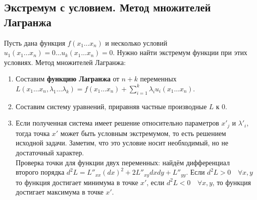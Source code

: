 \subsection{Экстремум с условием. Метод множителей Лагранжа}
Пусть дана функция $f(x_1 \ldots x_n)$ и несколько условий $u_1(x_1 \ldots x_n) = 0 \ldots u_k(x_1 \ldots x_n) = 0$. Нужно найти экстремум функции при этих условиях. Метод множителей Лагранжа:
\begin{enumerate}
	\item Составим \textbf{функцию Лагранжа} от $n + k$ переменных $L(x_1 \ldots x_n, \lambda_1 \ldots \lambda_k) = f(x_1 \ldots x_n) + \sum\limits_{i = 1}^{k} \lambda_i u_i(x_1 \ldots x_n)$.
	\item Составим систему уравнений, приравняв частные производные $L$ к $0$.
	\item Если полученная система имеет решение относительно параметров $x'_{j}$ и $\lambda '_{i}$, тогда точка $x'$ может быть условным экстремумом, то есть решением исходной задачи. Заметим, что это условие носит необходимый, но не достаточный характер.\\
	Проверка точки для функции двух переменных: найдём дифференциал второго порядка $d^2 L = L''_{xx} (dx)^2 + 2L''_{xy}dxdy + L''_{yy}$. Если $d^2 L > 0 \quad \forall x, y$ то функция достигает минимума в точке $x'$, если $d^2 L < 0 \quad \forall x, y$, то функция достигает максимума в точке $x'$.
\end{enumerate} 